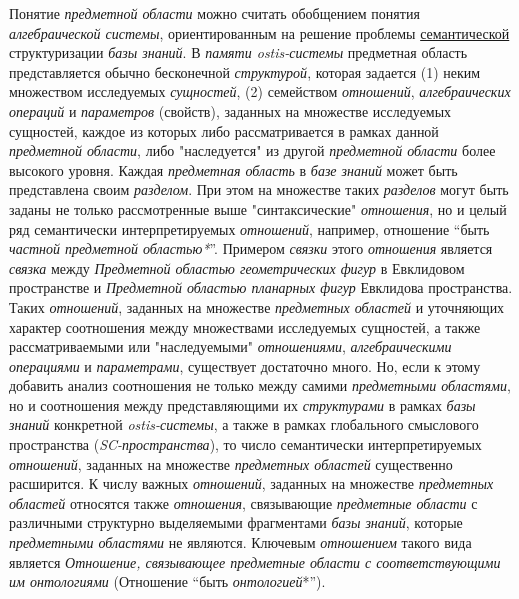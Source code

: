 \begin{SCn}
{	Понятие \textit{предметной области} можно считать обобщением понятия \textit{алгебраической системы}, ориентированным на решение проблемы \uline{семантической} структуризации \textit{базы знаний}. В \textit{памяти ostis-системы} предметная область представляется обычно бесконечной \textit{структурой}, которая задается (1) неким множеством исследуемых \textit{сущностей}, (2) семейством \textit{отношений}, \textit{алгебраических операций} и \textit{параметров} (свойств), заданных на множестве исследуемых сущностей, каждое из которых либо рассматривается в рамках данной \textit{предметной области}, либо "наследуется"{} из другой \textit{предметной области} более высокого уровня. Каждая \textit{предметная область} в \textit{базе знаний} может быть представлена своим \textit{разделом}. При этом на множестве таких \textit{разделов} могут быть заданы не только рассмотренные выше "синтаксические"{} \textit{отношения}, но и целый ряд семантически интерпретируемых \textit{отношений}, например, отношение ``быть \textit{частной предметной областью*}''{}. Примером \textit{связки} этого \textit{отношения} является \textit{связка} между \textit{Предметной областью геометрических фигур} в Евклидовом пространстве и \textit{Предметной областью планарных фигур} Евклидова пространства. Таких \textit{отношений}, заданных на множестве \textit{предметных областей} и уточняющих характер соотношения между множествами исследуемых сущностей, а также рассматриваемыми или "наследуемыми"{} \textit{отношениями}, \textit{алгебраическими операциями} и \textit{параметрами}, существует достаточно много. Но, если к этому добавить анализ соотношения не только между самими \textit{предметными областями}, но и соотношения между представляющими их \textit{структурами} в рамках \textit{базы знаний} конкретной \textit{ostis-системы}, а также в рамках глобального смыслового пространства (\textit{SC-пространства}), то число семантически интерпретируемых \textit{отношений}, заданных на множестве \textit{предметных областей} существенно расширится. К числу важных \textit{отношений}, заданных на множестве \textit{предметных областей} относятся также \textit{отношения}, связывающие \textit{предметные области} с различными структурно выделяемыми фрагментами \textit{базы знаний}, которые \textit{предметными областями} не являются. Ключевым \textit{отношением} такого вида является \textit{Отношение, связывающее предметные области с соответствующими им онтологиями} (Отношение ``быть \textit{онтологией}*'').} 
\end{SCn}
